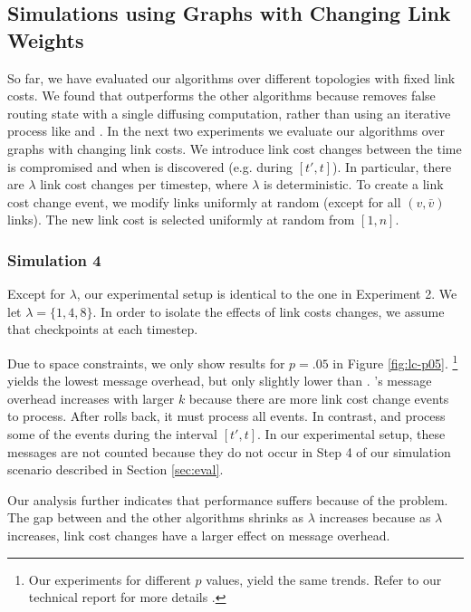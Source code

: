 \subsection{Simulations using Graphs with Changing Link Weights}
\label{subsec:change}



So far, we have evaluated our algorithms over different topologies with fixed link costs. We found that \cpr outperforms the other algorithms because \cpr removes false
routing state with a single diffusing computation, rather than using an iterative process like \second and \purges.  In the next 
two experiments we evaluate our algorithms over graphs with changing link costs. We introduce link cost changes between the time \bad is compromised and when \bad is discovered 
(e.g. during $[t',t]$). 
In particular, there are $\lambda$ link cost changes per timestep, where $\lambda$ is deterministic. 
To create a link cost change event, we modify links uniformly at random (except for all $(v,\bar{v})$ links). %
The new link cost is selected uniformly at random from $[1,n]$. 

\subsubsection{Simulation 4}

Except for $\lambda$, our experimental setup is identical to the one in Experiment 2. We let $\lambda = \{1,4,8\}$. In order to isolate the effects of link costs changes,
we assume that \cpr checkpoints at each timestep.

Due to space constraints, we only show results for $p=.05$ in Figure \ref{fig:lc-p05}.  
{\footnote {\small Our experiments for different $p$ values, yield the same trends.  Refer to our technical report for more details \cite{Tech}.}}
\purge yields the lowest message overhead, but only slightly lower than \cprs. 
\cprs's message overhead increases with larger $k$ because there are more link cost change events to process. After \cpr rolls back, it must process all \lcd events. 
In contrast, \second and \purge process some of the \lcd events during the interval $[t',t]$.  In our experimental setup, these messages are not counted because 
they do not occur in Step 4 of our simulation scenario described in Section \ref{sec:eval}.

Our analysis further indicates that \second performance suffers because of the \infinity problem. %
The gap between \second and the other algorithms shrinks as $\lambda$ increases because as $\lambda$ increases, link cost changes have a larger effect on message overhead.



